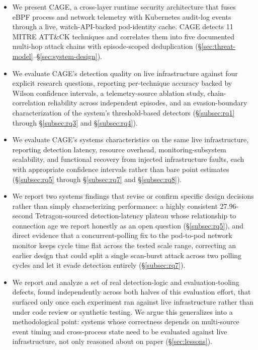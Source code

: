 \documentclass{ieeeaccess}
\begin{document}
\begin{itemize}
\item We present CAGE, a cross-layer runtime security architecture that
  fuses eBPF process and network telemetry with Kubernetes audit-log
  events through a live, watch-API-backed pod-identity cache. CAGE
  detects 11 MITRE ATT\&CK techniques and correlates them into five
  documented multi-hop attack chains with episode-scoped deduplication
  (\S\ref{sec:threat-model}--\S\ref{sec:system-design}).
\item We evaluate CAGE's detection quality on live infrastructure against
  four explicit research questions, reporting per-technique accuracy
  backed by Wilson confidence intervals, a telemetry-source ablation
  study, chain-correlation reliability across independent episodes, and
  an evasion-boundary characterization of the system's threshold-based
  detectors (\S\ref{subsec:rq1} through \S\ref{subsec:rq3} and \S\ref{subsec:rq4}).
\item We evaluate CAGE's systems characteristics on the same live
  infrastructure, reporting detection latency, resource overhead,
  monitoring-subsystem scalability, and functional recovery from
  injected infrastructure faults, each with appropriate confidence
  intervals rather than bare point estimates (\S\ref{subsec:rq5} through \S\ref{subsec:rq7} and \S\ref{subsec:rq8}).
\item We report two systems findings that revise or confirm specific design
  decisions rather than simply characterizing performance: a highly
  consistent 27.96-second Tetragon-sourced detection-latency plateau
  whose relationship to connection age we report honestly as an open
  question (\S\ref{subsec:rq5}), and direct evidence that a concurrent-polling fix to
  the pod-to-pod network monitor keeps cycle time flat across the tested
  scale range, correcting an earlier design that could split a single
  scan-burst attack across two polling cycles and let it evade detection
  entirely (\S\ref{subsec:rq7}).
\item We report and analyze a set of real detection-logic and
  evaluation-tooling defects, found independently across both halves of
  this evaluation effort, that surfaced only once each experiment ran
  against live infrastructure rather than under code review or
  synthetic testing. We argue this generalizes into a methodological
  point: systems whose correctness depends on multi-source event timing
  and cross-process state need to be evaluated against live
  infrastructure, not only reasoned about on paper (\S\ref{sec:lessons}).
\end{itemize}
\end{document}
